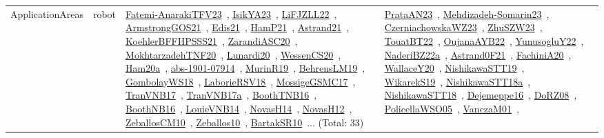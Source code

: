 {\begin{longtable}{lp{3cm}>{\raggedright\arraybackslash}p{6cm}>{\raggedright\arraybackslash}p{6cm}>{\raggedright\arraybackslash}p{8cm}}
ApplicationAreas & robot & \href{../works/Fatemi-AnarakiTFV23.pdf}{Fatemi-AnarakiTFV23}~\cite{Fatemi-AnarakiTFV23}, \href{../works/IsikYA23.pdf}{IsikYA23}~\cite{IsikYA23}, \href{../works/LiFJZLL22.pdf}{LiFJZLL22}~\cite{LiFJZLL22}, \href{../works/ArmstrongGOS21.pdf}{ArmstrongGOS21}~\cite{ArmstrongGOS21}, \href{../works/Edis21.pdf}{Edis21}~\cite{Edis21}, \href{../works/HamP21.pdf}{HamP21}~\cite{HamP21}, \href{../works/Astrand21.pdf}{Astrand21}~\cite{Astrand21}, \href{../works/KoehlerBFFHPSSS21.pdf}{KoehlerBFFHPSSS21}~\cite{KoehlerBFFHPSSS21}, \href{../works/ZarandiASC20.pdf}{ZarandiASC20}~\cite{ZarandiASC20}, \href{../works/MokhtarzadehTNF20.pdf}{MokhtarzadehTNF20}~\cite{MokhtarzadehTNF20}, \href{../works/Lunardi20.pdf}{Lunardi20}~\cite{Lunardi20}, \href{../works/WessenCS20.pdf}{WessenCS20}~\cite{WessenCS20}, \href{../works/Ham20a.pdf}{Ham20a}~\cite{Ham20a}, \href{../works/abs-1901-07914.pdf}{abs-1901-07914}~\cite{abs-1901-07914}, \href{../works/MurinR19.pdf}{MurinR19}~\cite{MurinR19}, \href{../works/BehrensLM19.pdf}{BehrensLM19}~\cite{BehrensLM19}, \href{../works/GombolayWS18.pdf}{GombolayWS18}~\cite{GombolayWS18}, \href{../works/LaborieRSV18.pdf}{LaborieRSV18}~\cite{LaborieRSV18}, \href{../works/MossigeGSMC17.pdf}{MossigeGSMC17}~\cite{MossigeGSMC17}, \href{../works/TranVNB17.pdf}{TranVNB17}~\cite{TranVNB17}, \href{../works/TranVNB17a.pdf}{TranVNB17a}~\cite{TranVNB17a}, \href{../works/BoothTNB16.pdf}{BoothTNB16}~\cite{BoothTNB16}, \href{../works/BoothNB16.pdf}{BoothNB16}~\cite{BoothNB16}, \href{../works/LouieVNB14.pdf}{LouieVNB14}~\cite{LouieVNB14}, \href{../works/NovasH14.pdf}{NovasH14}~\cite{NovasH14}, \href{../works/NovasH12.pdf}{NovasH12}~\cite{NovasH12}, \href{../works/ZeballosCM10.pdf}{ZeballosCM10}~\cite{ZeballosCM10}, \href{../works/Zeballos10.pdf}{Zeballos10}~\cite{Zeballos10}, \href{../works/BartakSR10.pdf}{BartakSR10}~\cite{BartakSR10}... (Total: 33) & \href{../works/PrataAN23.pdf}{PrataAN23}~\cite{PrataAN23}, \href{../works/Mehdizadeh-Somarin23.pdf}{Mehdizadeh-Somarin23}~\cite{Mehdizadeh-Somarin23}, \href{../works/CzerniachowskaWZ23.pdf}{CzerniachowskaWZ23}~\cite{CzerniachowskaWZ23}, \href{../works/ZhuSZW23.pdf}{ZhuSZW23}~\cite{ZhuSZW23}, \href{../works/TouatBT22.pdf}{TouatBT22}~\cite{TouatBT22}, \href{../works/OujanaAYB22.pdf}{OujanaAYB22}~\cite{OujanaAYB22}, \href{../works/YunusogluY22.pdf}{YunusogluY22}~\cite{YunusogluY22}, \href{../works/NaderiBZ22a.pdf}{NaderiBZ22a}~\cite{NaderiBZ22a}, \href{../works/Astrand0F21.pdf}{Astrand0F21}~\cite{Astrand0F21}, \href{../works/FachiniA20.pdf}{FachiniA20}~\cite{FachiniA20}, \href{../works/WallaceY20.pdf}{WallaceY20}~\cite{WallaceY20}, \href{../works/NishikawaSTT19.pdf}{NishikawaSTT19}~\cite{NishikawaSTT19}, \href{../works/WikarekS19.pdf}{WikarekS19}~\cite{WikarekS19}, \href{../works/NishikawaSTT18a.pdf}{NishikawaSTT18a}~\cite{NishikawaSTT18a}, \href{../works/NishikawaSTT18.pdf}{NishikawaSTT18}~\cite{NishikawaSTT18}, \href{../works/Dejemeppe16.pdf}{Dejemeppe16}~\cite{Dejemeppe16}, \href{../works/DoRZ08.pdf}{DoRZ08}~\cite{DoRZ08}, \href{../works/PolicellaWSO05.pdf}{PolicellaWSO05}~\cite{PolicellaWSO05}, \href{../works/VanczaM01.pdf}{VanczaM01}~\cite{VanczaM01}, 
\end{longtable}}
